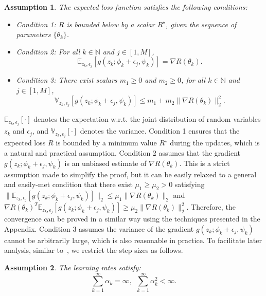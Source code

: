 \documentclass{article}
\newtheorem{assumption}{Assumption}[section]
\begin{document}
\begin{assumption}\label{assump:gradient}
The expected loss function satisfies the following conditions:

\begin{itemize}
    \item Condition 1: 
    $R$ is bounded below by a scalar $R^\star$, given the sequence of parameters $\{\theta_k\}$.
    \item Condition 2:
    For all $k\in \mathbb{N}$ and $j\in[1, M]$, 
    \begin{equation}
        \mathbb{E}_{z_{k},\epsilon_j}[g(z_k;\phi_k +\epsilon_j, \psi_k)] = \nabla R(\theta_k).
    \end{equation}
    \item Condition 3:
    There exist scalars $m_1\geq0$ and $m_2\geq0$, for all $k\in \mathbb{N}$ and $j\in[1, M]$,
    \begin{equation} \label{eq:var}
        \mathbb{V}_{z_{k},\epsilon_j}[g(z_k;\phi_k +\epsilon_j, \psi_k)] \leq m_1 + m_2\|\nabla R(\theta_k)\|_{2}^{2}.
    \end{equation}
\end{itemize}
\end{assumption}

$\mathbb{E}_{z_{k},\epsilon_j}[\cdot]$ denotes the expectation w.r.t. the joint distribution of random variables $z_k$ and $\epsilon_j$, and $\mathbb{V}_{z_{k},\epsilon_j}[\cdot]$ denotes the variance.
Condition 1 ensures that the expected loss $R$ is bounded by a minimum value $R^\star$ during the updates, which is a natural and practical assumption. Condition 2 assumes that the gradient $g(z_k;\phi_k +\epsilon_j, \psi_k)$ is an unbiased estimate of $\nabla R(\theta_k)$. This is a strict assumption made to simplify the proof, but it can be easily relaxed to a general and easily-met condition that there exist $\mu_1 \geq \mu_2>0$ satisfying $\|\mathbb{E}_{z_{k},\epsilon_j}[g(z_k;\phi_k +\epsilon_j, \psi_k)]\|_2 \leq \mu_1\|\nabla R(\theta_k)\|_2$ and $\nabla R(\theta_k)^{T}\mathbb{E}_{z_{k},\epsilon_j}[g(z_k;\phi_k +\epsilon_j, \psi_k)] \geq \mu_2\|\nabla R(\theta_k)\|_2^2$.
Therefore, the convergence can be proved in a similar way using the techniques presented in the Appendix. Condition 3 assumes the variance of the gradient $g(z_k;\phi_k +\epsilon_j, \psi_k)$ cannot be arbitrarily large, which is also reasonable in practice.
To facilitate later analysis, similar to~\citep{Robbins2007ASA}, we restrict the step sizes  as follows.

\begin{assumption}\label{assump:lr}
The learning rates satisfy:
\begin{equation}\label{eq:lr}
    \sum_{k=1}^{\infty}\alpha_k=\infty, \:\:\sum_{k=1}^{\infty}\alpha_k^2<\infty.
\end{equation}
\end{assumption}
\end{document}
